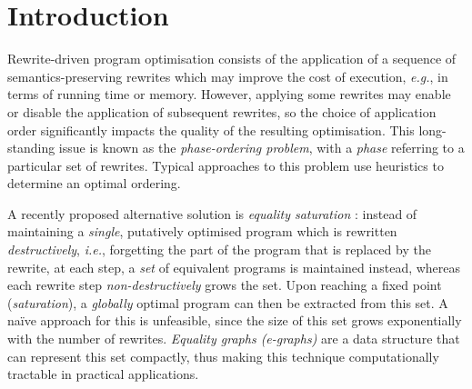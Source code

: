 
\section{Introduction}\label{sec:introduction}


Rewrite-driven program optimisation consists of the application of a sequence of semantics-preserving rewrites which may improve the cost of execution, \emph{e.g.}, in terms of running time or memory.
However, applying some rewrites may enable or disable the application of subsequent rewrites, so the choice of application order significantly impacts the quality of the resulting optimisation.  
This long-standing issue is known as the \textit{phase-ordering problem}, with a \textit{phase} referring to a particular set of rewrites.
Typical approaches to this problem use heuristics to determine an optimal ordering.

A recently proposed alternative solution is \textit{equality saturation} 
\cite{10.1145/1594834.1480915}: instead of maintaining a \textit{single},  putatively optimised program which is rewritten \textit{destructively}, \textit{i.e.}, forgetting the part of the program that is replaced by the rewrite, at each step, a \textit{set} of equivalent programs is maintained instead, whereas each rewrite step \textit{non-destructively} grows the set.  
Upon reaching a fixed point (\textit{saturation}),  a \textit{globally} optimal program can then be extracted from this set.
A na\"ive approach for this is unfeasible, since the size of this set grows exponentially with the number of rewrites. 
\textit{Equality graphs (e-graphs)} \cite{EggPaper} are a data structure that can represent this set compactly, thus making this technique computationally tractable in practical applications.

